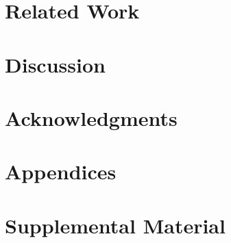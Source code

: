\documentclass[11pt,a4paper]{article}
\newcommand{\mpTodo}[1]{\Todo[MP:]{\textcolor{green}{#1}}}
\begin{document}
\section{Related Work \label{sec:related}}
\mpTodo{related work}
\section{Discussion \label{sec:discussion}}
\mpTodo{discussion}
\section*{Acknowledgments}



\appendix
\section{Appendices}
\label{sec:appendix}
\mpTodo{appendix}
\section{Supplemental Material}
\label{sec:supplemental}
\end{document}

